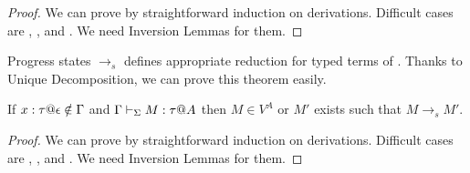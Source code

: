 \begin{proof}
	We can prove by straightforward induction on derivations.
	Difficult cases are \TApp, \TTBL, and \TIns.
	We need Inversion Lemmas for them.
\end{proof}

Progress states $\longrightarrow_s$ defines appropriate reduction for typed terms of \LMD.
Thanks to Unique Decomposition, we can prove this theorem easily.

\begin{theorem}[Progress]
	If $x:\tau @\epsilon \notin \Gamma$ and $\Gamma \vdash_\Sigma M : \tau  @ A$ then
	$ M \in V^A $ or $M'$ exists such that $M \longrightarrow_s M'$.
\end{theorem}

\begin{proof}
	We can prove by straightforward induction on derivations.
	Difficult cases are \TApp, \TTBL, and \TIns.
	We need Inversion Lemmas for them.
\end{proof}


